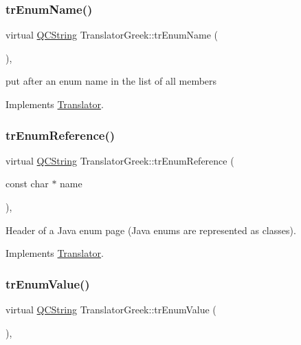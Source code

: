 \subsubsection{\texorpdfstring{trEnumName()}{trEnumName()}}
{\footnotesize\ttfamily virtual \mbox{\hyperlink{class_q_c_string}{Q\+C\+String}} Translator\+Greek\+::tr\+Enum\+Name (\begin{DoxyParamCaption}{ }\end{DoxyParamCaption})\hspace{0.3cm}{\ttfamily [inline]}, {\ttfamily [virtual]}}

put after an enum name in the list of all members 

Implements \mbox{\hyperlink{class_translator}{Translator}}.

\mbox{\label{class_translator_greek_a6055ee92b04946218e7a55c0235d1314}} 
\subsubsection{\texorpdfstring{trEnumReference()}{trEnumReference()}}
{\footnotesize\ttfamily virtual \mbox{\hyperlink{class_q_c_string}{Q\+C\+String}} Translator\+Greek\+::tr\+Enum\+Reference (\begin{DoxyParamCaption}\item[{const char $\ast$}]{name }\end{DoxyParamCaption})\hspace{0.3cm}{\ttfamily [inline]}, {\ttfamily [virtual]}}

Header of a Java enum page (Java enums are represented as classes). 

Implements \mbox{\hyperlink{class_translator}{Translator}}.

\mbox{\label{class_translator_greek_afd8eaa8133b7945efe82766718a907c0}} 
\subsubsection{\texorpdfstring{trEnumValue()}{trEnumValue()}}
{\footnotesize\ttfamily virtual \mbox{\hyperlink{class_q_c_string}{Q\+C\+String}} Translator\+Greek\+::tr\+Enum\+Value (\begin{DoxyParamCaption}{ }\end{DoxyParamCaption})\hspace{0.3cm}{\ttfamily [inline]}, {\ttfamily [virtual]}}

